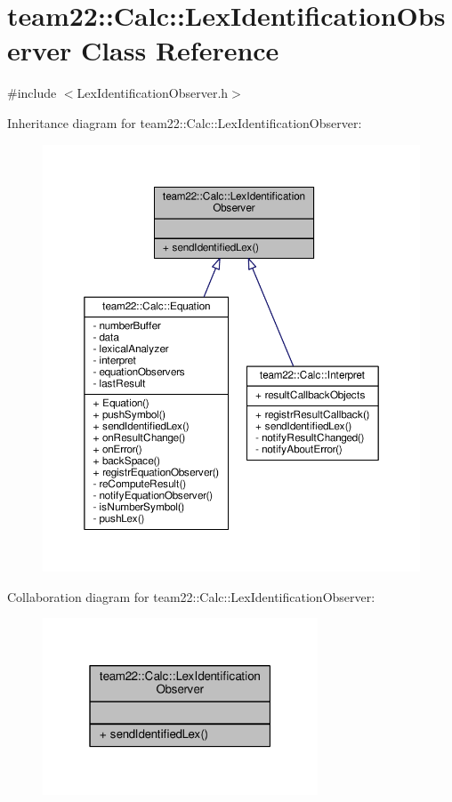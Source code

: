 \hypertarget{classteam22_1_1_calc_1_1_lex_identification_observer}{}\section{team22\+:\+:Calc\+:\+:Lex\+Identification\+Observer Class Reference}
\label{classteam22_1_1_calc_1_1_lex_identification_observer}


{\ttfamily \#include $<$Lex\+Identification\+Observer.\+h$>$}



Inheritance diagram for team22\+:\+:Calc\+:\+:Lex\+Identification\+Observer\+:
\nopagebreak
\begin{figure}[H]
\begin{center}
\leavevmode
\includegraphics[width=350pt]{classteam22_1_1_calc_1_1_lex_identification_observer__inherit__graph}
\end{center}
\end{figure}


Collaboration diagram for team22\+:\+:Calc\+:\+:Lex\+Identification\+Observer\+:
\nopagebreak
\begin{figure}[H]
\begin{center}
\leavevmode
\includegraphics[width=232pt]{classteam22_1_1_calc_1_1_lex_identification_observer__coll__graph}
\end{center}
\end{figure}
